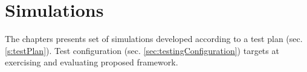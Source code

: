 \chapter{Simulations}\label{Simulations}


\noindent The chapters presents set of simulations developed according to a test plan (sec. \ref{s:testPlan}). Test configuration (sec. \ref{sec:testingConfiguration}) targets at exercising and evaluating proposed framework.